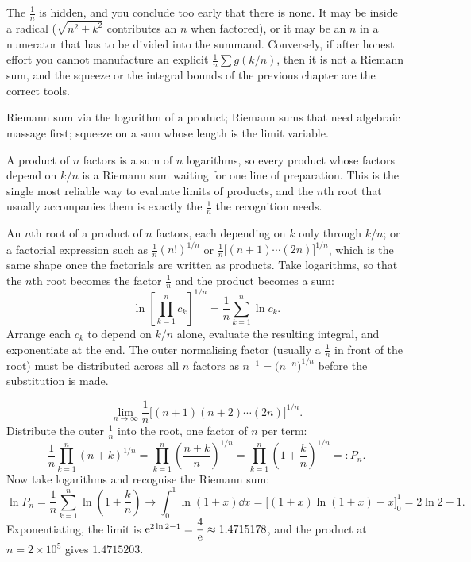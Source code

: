 \begin{trap}
The $\tfrac1n$ is hidden, and you conclude too early that there is none. It may be inside a radical ($\sqrt{n^{2}+k^{2}}$ contributes an $n$ when factored), or it may be an $n$ in a numerator that has to be divided into the summand. Conversely, if after honest effort you cannot manufacture an explicit $\tfrac1n\sum g(k/n)$, then it is not a Riemann sum, and the squeeze or the integral bounds of the previous chapter are the correct tools.
\end{trap}

\begin{seealsob}Riemann sum via the logarithm of a product; Riemann sums that need algebraic massage first; squeeze on a sum whose length is the limit variable.\end{seealsob}

A product of $n$ factors is a sum of $n$ logarithms, so every product whose factors depend on $k/n$ is a Riemann sum waiting for one line of preparation. This is the single most reliable way to evaluate limits of products, and the $n$th root that usually accompanies them is exactly the $\tfrac1n$ the recognition needs.

\cue An $n$th root of a product of $n$ factors, each depending on $k$ only through $k/n$; or a factorial expression such as $\tfrac{1}{n}(n!)^{1/n}$ or $\tfrac1n\bigl[(n+1)\cdots(2n)\bigr]^{1/n}$, which is the same shape once the factorials are written as products.
\method Take logarithms, so that the $n$th root becomes the factor $\tfrac1n$ and the product becomes a sum:
\[\ln\left[\prod_{k=1}^{n}c_{k}\right]^{1/n}=\frac1n\sum_{k=1}^{n}\ln c_{k}.\]
Arrange each $c_{k}$ to depend on $k/n$ alone, evaluate the resulting integral, and exponentiate at the end. The outer normalising factor (usually a $\tfrac1n$ in front of the root) must be distributed across all $n$ factors as $n^{-1}=\bigl(n^{-n}\bigr)^{1/n}$ before the substitution is made.

\begin{worked}
\[\lim_{n\to\infty}\frac1n\bigl[(n+1)(n+2)\cdots(2n)\bigr]^{1/n}.\]
Distribute the outer $\tfrac1n$ into the root, one factor of $n$ per term:
\[\frac1n\prod_{k=1}^{n}(n+k)^{1/n}=\prod_{k=1}^{n}\left(\frac{n+k}{n}\right)^{1/n}=\prod_{k=1}^{n}\left(1+\frac{k}{n}\right)^{1/n}=:P_{n}.\]
Now take logarithms and recognise the Riemann sum:
\[\ln P_{n}=\frac1n\sum_{k=1}^{n}\ln\left(1+\frac kn\right)\longrightarrow\int_{0}^{1}\ln(1+x)\dd x=\bigl[(1+x)\ln(1+x)-x\bigr]_{0}^{1}=2\ln2-1 .\]
Exponentiating, the limit is $\mathrm{e}^{2\ln2-1}=\dfrac{4}{\mathrm{e}}\approx1.4715178$, and the product at $n=2\times10^{5}$ gives $1.4715203$.
\end{worked}

